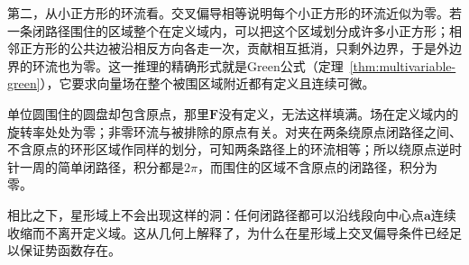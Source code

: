 第二，从小正方形的环流看。交叉偏导相等说明每个小正方形的环流近似为零。若一条闭路径围住的区域整个在定义域内，可以把这个区域划分成许多小正方形；相邻正方形的公共边被沿相反方向各走一次，贡献相互抵消，只剩外边界，于是外边界的环流也为零。这一推理的精确形式就是Green公式（定理~\ref{thm:multivariable-green}），它要求向量场在整个被围区域附近都有定义且连续可微。

单位圆围住的圆盘却包含原点，那里$\bm F$没有定义，无法这样填满。场在定义域内的旋转率处处为零；非零环流与被排除的原点有关。对夹在两条绕原点闭路径之间、不含原点的环形区域作同样的划分，可知两条路径上的环流相等；所以绕原点逆时针一周的简单闭路径，积分都是$2\pi$，而围住的区域不含原点的闭路径，积分为零。

相比之下，星形域上不会出现这样的洞：任何闭路径都可以沿线段向中心点$\bm a$连续收缩而不离开定义域。这从几何上解释了，为什么在星形域上交叉偏导条件已经足以保证势函数存在。

\FloatBarrier
